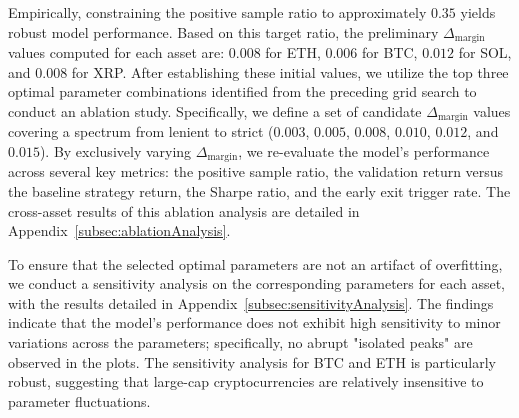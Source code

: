 \documentclass[12pt]{article}
\begin{document}
Empirically, constraining the positive sample ratio to approximately $0.35$ yields robust model performance. Based on this target ratio, the preliminary $\Delta_{\text{margin}}$ values computed for each asset are: $0.008$ for ETH, $0.006$ for BTC, $0.012$ for SOL, and $0.008$ for XRP. After establishing these initial values, we utilize the top three optimal parameter combinations identified from the preceding grid search to conduct an ablation study. Specifically, we define a set of candidate $\Delta_{\text{margin}}$ values covering a spectrum from lenient to strict ($0.003$, $0.005$, $0.008$, $0.010$, $0.012$, and $0.015$). By exclusively varying $\Delta_{\text{margin}}$, we re-evaluate the model's performance across several key metrics: the positive sample ratio, the validation return versus the baseline strategy return, the Sharpe ratio, and the early exit trigger rate. The cross-asset results of this ablation analysis are detailed in Appendix~\ref{subsec:ablationAnalysis}.

To ensure that the selected optimal parameters are not an artifact of overfitting, we conduct a sensitivity analysis on the corresponding parameters for each asset, with the results detailed in Appendix~\ref{subsec:sensitivityAnalysis}. The findings indicate that the model's performance does not exhibit high sensitivity to minor variations across the parameters; specifically, no abrupt "isolated peaks" are observed in the plots. The sensitivity analysis for BTC and ETH is particularly robust, suggesting that large-cap cryptocurrencies are relatively insensitive to parameter fluctuations.


\end{document}
